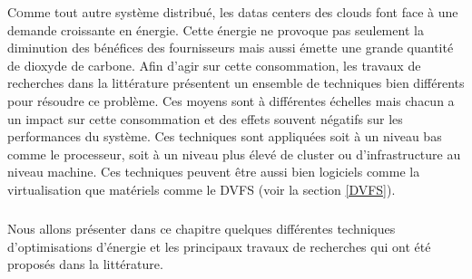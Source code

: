 \begin{onehalfspace}
\lettrine[nindent=1em,lines=3]{C}omme tout autre système distribué, les datas centers des clouds font face à une demande croissante en énergie. Cette énergie ne provoque pas seulement la diminution des bénéfices des fournisseurs mais aussi émette une grande quantité de dioxyde de carbone. Afin d’agir sur cette  consommation, les travaux de recherches dans la littérature présentent un  ensemble de techniques  bien différents pour résoudre ce problème. Ces moyens sont à différentes échelles mais chacun a un impact sur cette consommation et des effets souvent négatifs sur les performances du système. Ces techniques sont appliquées soit  à un niveau bas comme le processeur, soit à un niveau plus élevé de cluster ou d’infrastructure au niveau machine. Ces techniques peuvent être aussi bien logiciels comme la virtualisation que  matériels comme le DVFS (voir la section \ref{DVFS}).\medskip
\subparagraph{}Nous allons présenter dans ce chapitre quelques différentes techniques d’optimisations d’énergie et les principaux travaux de recherches qui ont été proposés dans la littérature.

\end{onehalfspace}
